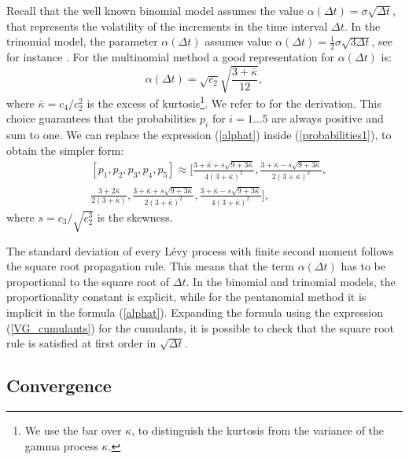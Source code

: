 Recall that the well known binomial model \cite{CRR79} assumes the value $\alpha(\Delta t) = \sigma \sqrt{\Delta t}$,
that represents the volatility of the increments in the time interval $\Delta t$.
In the trinomial model, the parameter $\alpha(\Delta t)$ assumes value $\alpha(\Delta t) = \frac{1}{2} \sigma \sqrt{3\Delta t}$, see for instance \cite{YaPr01}.
For the multinomial method a good representation for $\alpha(\Delta t)$ is:
\begin{equation}\label{alphat}
 \alpha(\Delta t) = \sqrt{c_2} \sqrt{\frac{3+\bar \kappa}{12}},
\end{equation}
where $\bar \kappa = c_4 / c_2^2$ is the excess of kurtosis\footnote{We use the bar over $\kappa$, 
to distinguish the kurtosis from the variance of the gamma process $\kappa$.}. 
We refer to \cite{YaPr06} for the derivation.
This choice guarantees that the probabilities $p_i$ for $i=1...5$ are always positive and sum to one. We can replace the expression
(\ref{alphat}) inside (\ref{probabilities1}), to obtain the simpler form:
\begin{align}\label{probabilities2}
 & [p_1,p_2,p_3,p_4,p_5] \approx \biggl[ \frac{3+\bar \kappa+s\sqrt{9+3\bar \kappa}}{4(3+\bar \kappa)^2} , 
 \frac{3+\bar \kappa-s\sqrt{9+3\bar \kappa}}{2(3+\bar \kappa)^2} , \\ \nonumber
 &
 \frac{3+2\bar \kappa}{2(3+\bar \kappa)} ,
 \frac{3+\bar \kappa+s\sqrt{9+3\bar \kappa}}{2(3+\bar \kappa)^2} ,
 \frac{3+\bar \kappa-s\sqrt{9+3\bar \kappa}}{4(3+\bar \kappa)^2} \biggr],
\end{align}
where $s = c_3 / \sqrt{c_2^3}$ is the skewness.
\begin{Remark}
 The standard deviation of every L\'{e}vy process with finite second moment follows the square root propagation rule. This means that the term $\alpha(\Delta t)$ has to be proportional
 to the square root of $\Delta t$. In the binomial and trinomial models, the proportionality constant is explicit, while for the pentanomial method it is implicit
 in the formula (\ref{alphat}). Expanding the formula using the expression (\ref{VG_cumulants}) for the cumulants, it is possible to check that the square root rule is
 satisfied at first order in $\sqrt{\Delta t}$.
\end{Remark}



\subsection{Convergence}


